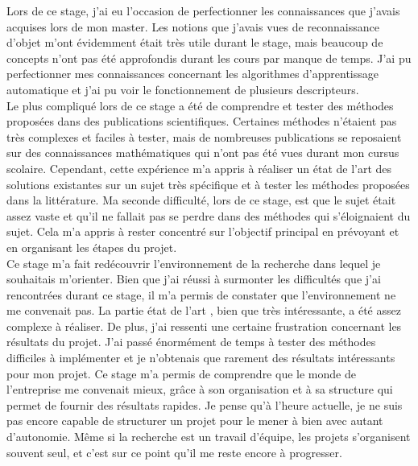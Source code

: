 Lors de ce stage, j'ai eu l'occasion de perfectionner les connaissances que j'avais acquises lors de mon master.
Les notions que j'avais vues de reconnaissance d'objet m'ont évidemment était très utile durant le stage, mais 
beaucoup de concepts n'ont pas été approfondis durant les cours par manque de temps. J'ai pu perfectionner mes 
connaissances concernant les algorithmes d'apprentissage automatique et j'ai pu voir le fonctionnement de plusieurs
descripteurs.\\ 

Le plus compliqué lors de ce stage a été de comprendre et tester des méthodes proposées dans des publications scientifiques.
Certaines méthodes n'étaient pas très complexes et faciles à tester, mais de nombreuses publications se reposaient sur des connaissances
mathématiques qui n'ont pas été vues durant mon cursus scolaire. Cependant, cette expérience m'a appris à réaliser un état de l'art des 
solutions existantes sur un sujet très spécifique et à tester les méthodes proposées dans la littérature. Ma seconde difficulté,
lors de ce stage, est que le sujet était assez vaste et qu'il ne fallait pas se perdre dans des méthodes qui s'éloignaient du sujet.
Cela m'a appris à rester concentré sur l'objectif principal en prévoyant et en organisant les étapes du projet.\\ 

Ce stage m'a fait redécouvrir l'environnement de la recherche dans lequel je souhaitais m'orienter. Bien que j'ai réussi à surmonter
les difficultés que j'ai rencontrées durant ce stage, il m'a permis de constater que l'environnement ne me convenait pas. La partie 
\og état de l'art \fg, bien que très intéressante, a été assez complexe à réaliser. De plus, j'ai ressenti une certaine frustration
concernant les résultats du projet. J'ai passé énormément de temps à tester des méthodes difficiles à implémenter et je n'obtenais
que rarement des résultats intéressants pour mon projet. Ce stage m'a permis de comprendre que le monde de l'entreprise me
convenait mieux, grâce à son organisation et à sa structure qui permet de fournir des résultats 
rapides. Je pense qu'à l'heure actuelle, je ne suis pas encore capable de structurer un projet pour
le mener à bien avec autant d'autonomie. Même si la recherche est un travail d'équipe, les projets 
s'organisent souvent seul, et c'est sur ce point qu'il me reste encore à progresser.
